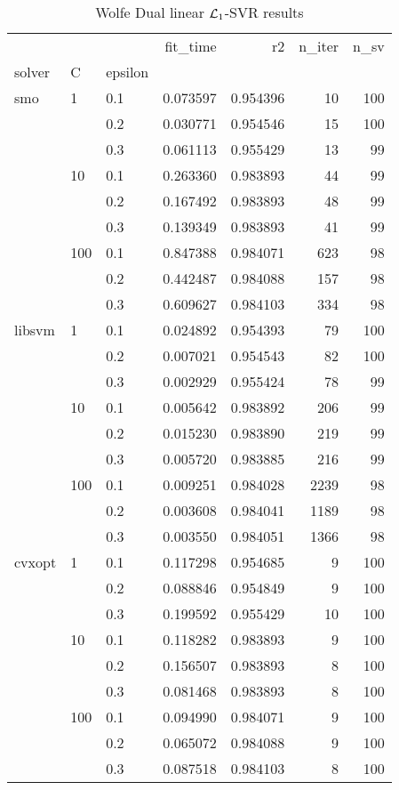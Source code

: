 \begin{table}[H]
\centering
\caption{Wolfe Dual linear $\protect \mathcal{L}_1$-SVR results}
\label{linear_dual_l1_svr_cv_results}
\begin{tabular}{lllrrrr}
\toprule
       &     &     &  fit\_time &        r2 &  n\_iter &  n\_sv \\
solver & C & epsilon &           &           &         &       \\
\midrule
smo & 1   & 0.1 &  0.073597 &  0.954396 &      10 &   100 \\
       &     & 0.2 &  0.030771 &  0.954546 &      15 &   100 \\
       &     & 0.3 &  0.061113 &  0.955429 &      13 &    99 \\
       & 10  & 0.1 &  0.263360 &  0.983893 &      44 &    99 \\
       &     & 0.2 &  0.167492 &  0.983893 &      48 &    99 \\
       &     & 0.3 &  0.139349 &  0.983893 &      41 &    99 \\
       & 100 & 0.1 &  0.847388 &  0.984071 &     623 &    98 \\
       &     & 0.2 &  0.442487 &  0.984088 &     157 &    98 \\
       &     & 0.3 &  0.609627 &  0.984103 &     334 &    98 \\
libsvm & 1   & 0.1 &  0.024892 &  0.954393 &      79 &   100 \\
       &     & 0.2 &  0.007021 &  0.954543 &      82 &   100 \\
       &     & 0.3 &  0.002929 &  0.955424 &      78 &    99 \\
       & 10  & 0.1 &  0.005642 &  0.983892 &     206 &    99 \\
       &     & 0.2 &  0.015230 &  0.983890 &     219 &    99 \\
       &     & 0.3 &  0.005720 &  0.983885 &     216 &    99 \\
       & 100 & 0.1 &  0.009251 &  0.984028 &    2239 &    98 \\
       &     & 0.2 &  0.003608 &  0.984041 &    1189 &    98 \\
       &     & 0.3 &  0.003550 &  0.984051 &    1366 &    98 \\
cvxopt & 1   & 0.1 &  0.117298 &  0.954685 &       9 &   100 \\
       &     & 0.2 &  0.088846 &  0.954849 &       9 &   100 \\
       &     & 0.3 &  0.199592 &  0.955429 &      10 &   100 \\
       & 10  & 0.1 &  0.118282 &  0.983893 &       9 &   100 \\
       &     & 0.2 &  0.156507 &  0.983893 &       8 &   100 \\
       &     & 0.3 &  0.081468 &  0.983893 &       8 &   100 \\
       & 100 & 0.1 &  0.094990 &  0.984071 &       9 &   100 \\
       &     & 0.2 &  0.065072 &  0.984088 &       9 &   100 \\
       &     & 0.3 &  0.087518 &  0.984103 &       8 &   100 \\
\bottomrule
\end{tabular}
\end{table}
